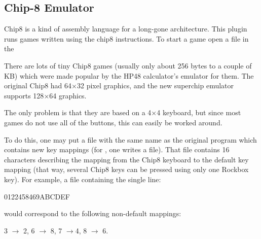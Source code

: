\subsection{\label{ref:Chip8emulator}Chip{}-8 Emulator}
Chip8 is a kind of assembly language for a long-gone architecture.
This plugin runs games written using the chip8 instructions.
To start a game open a  file in the 

There are lots of tiny Chip8 games (usually only about 256 bytes to a
couple of KB) which were made popular by the HP48
calculator's emulator for them. The original Chip8 had
64$\times$32 pixel graphics, and the new superchip emulator supports 128$\times$64
graphics.

The only problem is that they are based on a 4$\times$4 keyboard, but since most
games do not use all of the buttons, this can easily be worked around.

To do this, one may put a  file with the same name as the
original program which contains new key mappings (for , one
writes a  file). That  file contains 16
characters describing the mapping from the Chip8 keyboard to the default key
mapping (that way, several Chip8 keys can be pressed using only one
Rockbox key). For example, a file containing the single line:
\begin{code}
    0122458469ABCDEF
\end{code}
would correspond to the following non-default mappings:

3 $\rightarrow$ 2, 6 $\rightarrow$ 8, 7 $\rightarrow$4, 8 $\rightarrow$ 6.

